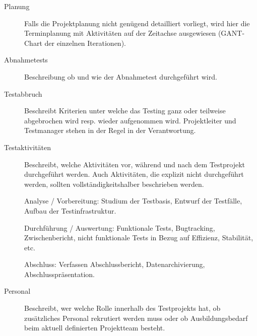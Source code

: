 \begin{description}
	\item[Planung] Falls die Projektplanung nicht genügend detailliert vorliegt, wird hier die Terminplanung mit Aktivitäten auf der Zeitachse ausgewiesen (GANT-Chart der einzelnen Iterationen).
	
	\item[Abnahmetests] Beschreibung ob und wie der Abnahmetest durchgeführt wird.
	
	\item[Testabbruch] Beschreibt Kriterien unter welche das Testing ganz oder teilweise abgebrochen wird resp. wieder aufgenommen wird. Projektleiter und Testmanager stehen in der Regel in der Verantwortung.
	
	\item[Testaktivitäten] Beschreibt, welche Aktivitäten vor, während und nach dem Testprojekt durchgeführt werden. Auch Aktivitäten, die explizit nicht durchgeführt werden, sollten vollständigkeitshalber beschrieben werden.
	
	\subitem Analyse / Vorbereitung: Studium der Testbasis, Entwurf der Testfälle, Aufbau der Testinfrastruktur.
	
	\subitem Durchführung / Auswertung: Funktionale Tests, Bugtracking, Zwischenbericht, nicht funktionale Tests in Bezug auf Effizienz, Stabilität, etc.
	
	\subitem Abschluss: Verfassen Abschlussbericht, Datenarchivierung, Abschlusspräsentation.
	
	\item[Personal] Beschreibt, wer welche Rolle innerhalb des Testprojekts hat, ob zusätzliches Personal rekrutiert werden muss oder ob Ausbildungsbedarf beim aktuell definierten Projektteam besteht.
	
\end{description}

